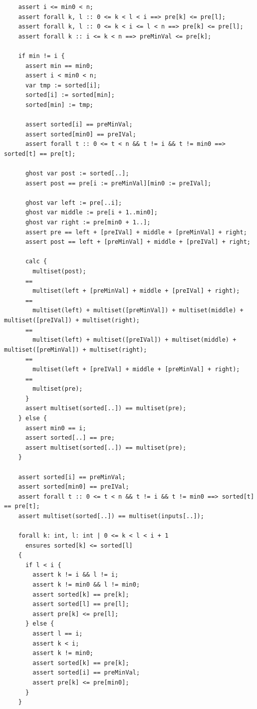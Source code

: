 \documentclass{article}
\begin{document}
\begin{lstlisting}
    assert i <= min0 < n;
    assert forall k, l :: 0 <= k < l < i ==> pre[k] <= pre[l];
    assert forall k, l :: 0 <= k < i <= l < n ==> pre[k] <= pre[l];
    assert forall k :: i <= k < n ==> preMinVal <= pre[k];

    if min != i {
      assert min == min0;
      assert i < min0 < n;
      var tmp := sorted[i];
      sorted[i] := sorted[min];
      sorted[min] := tmp;

      assert sorted[i] == preMinVal;
      assert sorted[min0] == preIVal;
      assert forall t :: 0 <= t < n && t != i && t != min0 ==> sorted[t] == pre[t];

      ghost var post := sorted[..];
      assert post == pre[i := preMinVal][min0 := preIVal];

      ghost var left := pre[..i];
      ghost var middle := pre[i + 1..min0];
      ghost var right := pre[min0 + 1..];
      assert pre == left + [preIVal] + middle + [preMinVal] + right;
      assert post == left + [preMinVal] + middle + [preIVal] + right;

      calc {
        multiset(post);
      ==
        multiset(left + [preMinVal] + middle + [preIVal] + right);
      ==
        multiset(left) + multiset([preMinVal]) + multiset(middle) + multiset([preIVal]) + multiset(right);
      ==
        multiset(left) + multiset([preIVal]) + multiset(middle) + multiset([preMinVal]) + multiset(right);
      ==
        multiset(left + [preIVal] + middle + [preMinVal] + right);
      ==
        multiset(pre);
      }
      assert multiset(sorted[..]) == multiset(pre);
    } else {
      assert min0 == i;
      assert sorted[..] == pre;
      assert multiset(sorted[..]) == multiset(pre);
    }

    assert sorted[i] == preMinVal;
    assert sorted[min0] == preIVal;
    assert forall t :: 0 <= t < n && t != i && t != min0 ==> sorted[t] == pre[t];
    assert multiset(sorted[..]) == multiset(inputs[..]);

    forall k: int, l: int | 0 <= k < l < i + 1
      ensures sorted[k] <= sorted[l]
    {
      if l < i {
        assert k != i && l != i;
        assert k != min0 && l != min0;
        assert sorted[k] == pre[k];
        assert sorted[l] == pre[l];
        assert pre[k] <= pre[l];
      } else {
        assert l == i;
        assert k < i;
        assert k != min0;
        assert sorted[k] == pre[k];
        assert sorted[i] == preMinVal;
        assert pre[k] <= pre[min0];
      }
    }


\end{lstlisting}
\end{document}

